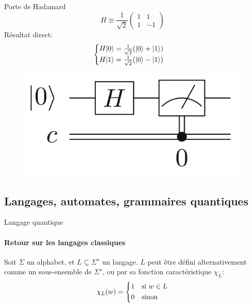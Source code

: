 \documentclass[aspectratio=169]{beamer}
\theoremstyle{plain}
\theoremstyle{definition}
\DeclarePairedDelimiter\ket{\lvert}{\rangle}
\begin{document}
\begin{frame}{Porte de Hadamard}
    \begin{equation*}
        H \cong \frac{1}{\sqrt{2}}
        \begin{pmatrix}
            1&1\\
            1&-1
        \end{pmatrix}
    \end{equation*}
    Résultat direct:
    \begin{equation*}
        \begin{cases}
            H\ket{0} = \frac{1}{\sqrt{2}}(\ket{0}+\ket{1}) \\
            H\ket{1} = \frac{1}{\sqrt{2}}(\ket{0}-\ket{1})
        \end{cases}
    \end{equation*}
    \begin{figure}
        \label{fig:basic-circuit}
        \centering
        \includegraphics[scale=0.3]{basic-circuit.png}
    \end{figure}
\end{frame}

%

\subsection{Langages, automates, grammaires quantiques}
\begin{frame}{Langage quantique}
    \framesubtitle{Retour sur les langages classiques}
    Soit $\Sigma$ un alphabet, et $L\subseteq \Sigma^\star$ un langage. $L$ peut être défini alternativement comme un sous-ensemble de $\Sigma^\star$, ou par sa fonction caractéristique $\chi_L$:
    \begin{equation*}
        \chi_L(w) = \begin{cases*}
            1 & si $w\in L$\\
            0 & sinon
        \end{cases*}
    \end{equation*}
\end{frame}
\end{document}
